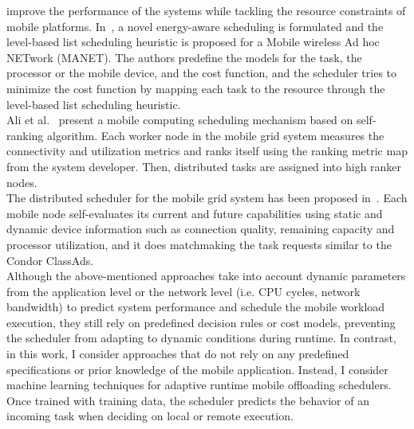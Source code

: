 improve the performance of the systems while tackling the resource
constraints of mobile platforms.
%
In~\cite{waleed}, a novel energy-aware scheduling is
formulated and the level-based list scheduling heuristic is proposed for
a Mobile wireless Ad hoc NETwork (MANET).
%
The authors predefine the models for the task, the processor or the
mobile device, and the cost function, and the scheduler tries to
minimize the cost function by mapping each task to the resource through
the level-based list scheduling heuristic.\\
%
Ali et al.~\cite{hesham} present a mobile computing scheduling
mechanism based on self-ranking algorithm. 
%
Each worker node in the mobile grid system measures the connectivity and
utilization metrics and ranks itself using the ranking metric map from
the system developer.
%
Then, distributed tasks are assigned into high ranker nodes.\\
%
The distributed scheduler for the mobile grid system has
been proposed in~\cite{karin}.
%
Each mobile node self-evaluates its current and future capabilities
using static and dynamic device information such as connection quality,
remaining capacity and processor utilization, and it does matchmaking
the task requests similar to the Condor ClassAds.\\
%
Although the above-mentioned approaches take into account dynamic parameters
from the application level or the network level (i.e. CPU cycles,
network bandwidth) to predict system performance and schedule the mobile
workload execution, they still rely on predefined decision rules or cost
models, preventing the scheduler from adapting to dynamic conditions
during runtime.
%
In contrast, in this work, I consider approaches that do not rely on
any predefined specifications or prior knowledge of the mobile
application.
%
Instead, I consider machine learning techniques for adaptive runtime mobile
offloading schedulers.
%
Once trained with training data, the scheduler 
predicts the behavior of an incoming task when deciding on local or
remote execution.
%

